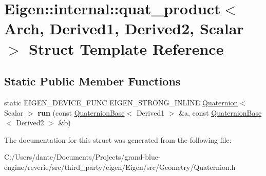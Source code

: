 \hypertarget{struct_eigen_1_1internal_1_1quat__product}{}\section{Eigen\+::internal\+::quat\+\_\+product$<$ Arch, Derived1, Derived2, Scalar $>$ Struct Template Reference}
\label{struct_eigen_1_1internal_1_1quat__product}
\subsection*{Static Public Member Functions}
\begin{DoxyCompactItemize}
\item 
\mbox{\label{struct_eigen_1_1internal_1_1quat__product_a84c5271d02e088d165237397504795b8}} 
static E\+I\+G\+E\+N\+\_\+\+D\+E\+V\+I\+C\+E\+\_\+\+F\+U\+NC E\+I\+G\+E\+N\+\_\+\+S\+T\+R\+O\+N\+G\+\_\+\+I\+N\+L\+I\+NE \mbox{\hyperlink{class_eigen_1_1_quaternion}{Quaternion}}$<$ Scalar $>$ {\bfseries run} (const \mbox{\hyperlink{class_eigen_1_1_quaternion_base}{Quaternion\+Base}}$<$ Derived1 $>$ \&a, const \mbox{\hyperlink{class_eigen_1_1_quaternion_base}{Quaternion\+Base}}$<$ Derived2 $>$ \&b)
\end{DoxyCompactItemize}


The documentation for this struct was generated from the following file\+:\begin{DoxyCompactItemize}
\item 
C\+:/\+Users/dante/\+Documents/\+Projects/grand-\/blue-\/engine/reverie/src/third\+\_\+party/eigen/\+Eigen/src/\+Geometry/Quaternion.\+h\end{DoxyCompactItemize}
